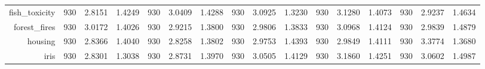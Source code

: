 \begin{table}[htbp]
{\begin{tabular}{rccccccccccccccc}
                  fish\_toxicity                      & 930                                     & \cellcolor[rgb]{ .776,  .937,  .808}\textcolor[rgb]{ 0,  .38,  0}{2.8151}          & 1.4249          & 930                             & 3.0409                                                                    & 1.4288          & 930                             & 3.0925          & 1.3230          & 930                             & 3.1280                                                                    & 1.4073          & 930                             & 2.9237                                                                    & 1.4634          \\
                  forest\_fires                       & 930                                     & 3.0172                                                                             & 1.4026          & 930                             & \cellcolor[rgb]{ .776,  .937,  .808}\textcolor[rgb]{ 0,  .38,  0}{2.9215} & 1.3800          & 930                             & 2.9806          & 1.3833          & 930                             & 3.0968                                                                    & 1.4124          & 930                             & 2.9839                                                                    & 1.4879          \\
                  housing                             & 930                                     & 2.8366                                                                             & 1.4040          & 930                             & \cellcolor[rgb]{ .776,  .937,  .808}\textcolor[rgb]{ 0,  .38,  0}{2.8258} & 1.3802          & 930                             & 2.9753          & 1.4393          & 930                             & 2.9849                                                                    & 1.4111          & 930                             & 3.3774                                                                    & 1.3680          \\
                  iris                                & 930                                     & \cellcolor[rgb]{ .776,  .937,  .808}\textcolor[rgb]{ 0,  .38,  0}{2.8301}          & 1.3038          & 930                             & 2.8731                                                                    & 1.3970          & 930                             & 3.0505          & 1.4129          & 930                             & 3.1860                                                                    & 1.4251          & 930                             & 3.0602                                                                    & 1.4987          \\

\end{tabular}}
\end{table}
